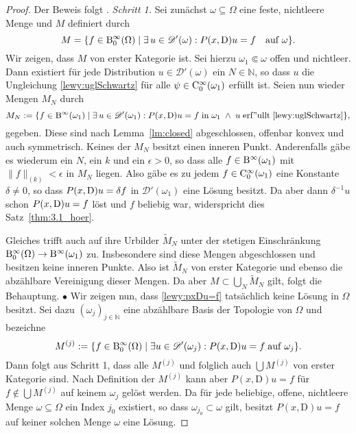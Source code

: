 \begin{proof} Der Beweis folgt {\cite[Theorem 3.2]{Hormander:1960a}}.
{\em Schritt 1.}
Sei zunächst $\omega\subseteq\Omega$ eine feste, nichtleere Menge und $M$ definiert durch
\begin{equation}
M=\{f\in \mathrm B_0^\infty(\Omega)\mid \exists\,u\in\mathscr{D}'(\omega) : P(x,\mathrm{D})u=f\quad \text{auf $\omega$}\}.
\end{equation}
Wir zeigen, dass $M$ von erster Kategorie ist.  Sei hierzu $\omega_1\Subset\omega$ offen und nichtleer. Dann existiert für jede Distribution $u\in\mathscr{D}'(\omega)$ ein $N\in\mathbb{N}$, so dass $u$ die Ungleichung \eqref{lewy:uglSchwartz}
für alle $\psi\in \mathrm C_0^\infty(\omega_1)$ erfüllt ist. Seien nun wieder Mengen $M_N$ durch
\begin{equation}
M_N:= \{f\in \mathrm B^\infty(\omega_1)\mid \exists\,u\in\mathscr D'(\omega_1): P(x,\mathrm{D})u=f\;\mathrm{in}\;\omega_1\;\wedge\; u\mathrm{\;erf"ullt\;}\eqref{lewy:uglSchwartz}\},
\end{equation}
gegeben. Diese sind nach Lemma~\ref{lm:closed} abgeschlossen, offenbar konvex und auch symmetrisch. 
Keines der $M_N$ besitzt einen inneren Punkt. 
Anderenfalls gäbe es wiederum ein $N$, ein $k$ und ein $\epsilon>0$, so dass alle $f\in \mathrm B^\infty(\omega_1)$ mit
$\|f\|_{(k)}<\epsilon$ in $M_N$ liegen. Also gäbe es zu jedem $f\in\mathrm C_0^\infty(\omega_1)$ eine Konstante $\delta\ne0$, so dass $P(x,\mathrm D)u=\delta f$ in $\mathscr D'(\omega_1)$ eine L\"osung besitzt. Da aber dann $\delta^{-1}u$ schon $P(x,\mathrm D)u=f$ löst und $f$ beliebig war, widerspricht dies Satz~\ref{thm:3.1_hoer}. 

Gleiches trifft auch auf ihre Urbilder $\widetilde M_N$ unter der stetigen Einschränkung $\mathrm B^\infty_0(\Omega)\to \mathrm B^\infty(\omega_1)$ zu. Insbesondere sind diese Mengen abgeschlossen und besitzen keine inneren Punkte. Also ist $\widetilde M_N$ von erster Kategorie und ebenso die abzählbare Vereinigung dieser Mengen. Da aber $M\subset \bigcup_N \widetilde M_N$ gilt, folgt die  Behauptung.
$\bullet$
Wir zeigen nun, dass \eqref{lewy:pxDu=f} tatsächlich keine Lösung in $\Omega$ besitzt. Sei dazu $(\omega_j)_{j\in\mathbb{N}}$ eine abzählbare Basis der Topologie von $\Omega$ und bezeichne
\begin{equation}
M^{(j)}:=\{f\in \mathrm B_0^\infty(\Omega)\mid \exists u\in\mathscr{D}'(\omega_j): P(x,\mathrm{D})u=f\;\mathrm{auf\;}\omega_j\}.
\end{equation}
Dann folgt aus Schritt 1, dass alle $M^{(j)}$ und folglich auch $\bigcup M^{(j)}$ von erster Kategorie sind. Nach Definition der $M^{(j)}$ kann aber $P(x,\mathrm{D})u=f$ für $f\not\in  \bigcup M^{(j)}$ auf keinem $\omega_j$ gelöst werden. Da für jede beliebige, offene, nichtleere Menge $\omega\subseteq\Omega$ ein Index $j_0$ existiert, so dass $\omega_{j_0}\subset\omega$ gilt, besitzt $P(x,\mathrm{D})u=f$ auf keiner solchen Menge $\omega$ eine Lösung. 
\end{proof}



